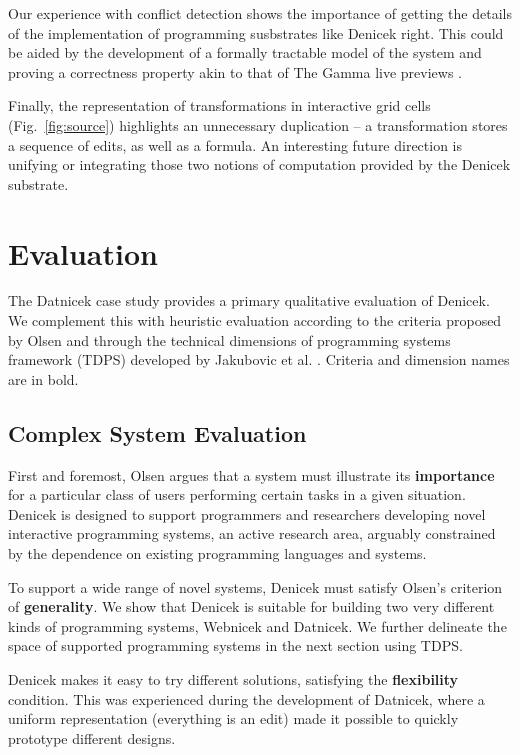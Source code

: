\documentclass[sigconf,anonymous,screen]{acmart}
\begin{document}
Our experience with conflict detection shows the importance of getting the details of the
implementation of programming susbstrates like Denicek right. This could be aided by the
development of a formally tractable model of the system and proving a correctness property
akin to that of The Gamma live previews \cite{petricek-2020-live}.

Finally, the representation of transformations in interactive grid cells (Fig.~\ref{fig:source})
highlights an unnecessary duplication -- a transformation stores a sequence of edits, as well as a formula.
An interesting future direction is unifying or integrating those two notions of computation
provided by the Denicek substrate.

\section{Evaluation}
\label{sec:eval}

The Datnicek case study provides a primary qualitative evaluation of Denicek. We complement this
with heuristic evaluation according to the criteria proposed by Olsen \cite{olsen-2007-evaluation}
and through the technical dimensions of programming systems framework (TDPS) developed by Jakubovic
et al. \cite{jakubovic-2023-techdims}. Criteria and dimension names are in bold.

\subsection{Complex System Evaluation}
First and foremost, Olsen \cite{olsen-2007-evaluation} argues that a system must illustrate
its \textbf{importance} for a particular class of users performing certain tasks in a given situation.
Denicek is designed to support programmers and researchers developing novel interactive programming systems,
an active research area, arguably constrained by the dependence on existing programming languages and systems.

To support a wide range of novel systems, Denicek must satisfy Olsen's criterion of \textbf{generality}.
We show that Denicek is suitable for building two very different kinds of programming systems, Webnicek
and Datnicek. We further delineate the space of supported programming systems in the next section using TDPS.

Denicek makes it easy to try different solutions, satisfying the \textbf{flexibility} condition.
This was experienced during the development of Datnicek, where a uniform representation (everything
is an edit) made it possible to quickly prototype different designs.
\end{document}
